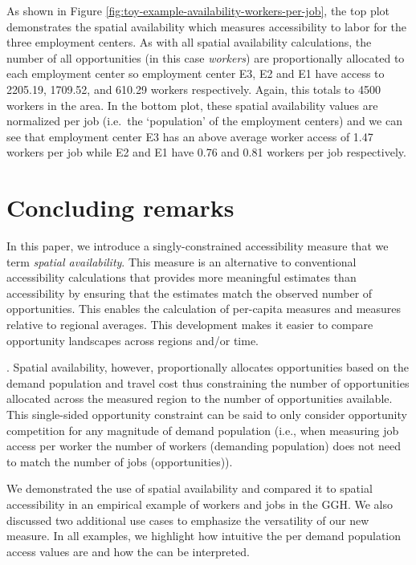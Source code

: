 \documentclass[]{elsarticle} %
\begin{document}
As shown in Figure \ref{fig:toy-example-availability-workers-per-job},
the top plot demonstrates the spatial availability which measures
accessibility to labor for the three employment centers. As with all
spatial availability calculations, the number of all opportunities (in
this case \emph{workers}) are proportionally allocated to each
employment center so employment center E3, E2 and E1 have access to
2205.19, 1709.52, and 610.29 workers respectively. Again, this totals to
4500 workers in the area. In the bottom plot, these spatial availability
values are normalized per job (i.e.~the `population' of the employment
centers) and we can see that employment center E3 has an above average
worker access of 1.47 workers per job while E2 and E1 have 0.76 and 0.81
workers per job respectively.

\hypertarget{concluding-remarks}{%
\section{Concluding remarks}\label{concluding-remarks}}

In this paper, we introduce a singly-constrained accessibility measure
that we term \emph{spatial availability}. This measure is an alternative
to conventional accessibility calculations that provides more meaningful
estimates than accessibility by ensuring that the estimates match the
observed number of opportunities. This enables the calculation of
per-capita measures and measures relative to regional averages. This
development makes it easier to compare opportunity landscapes across
regions and/or time.

. Spatial availability, however, proportionally allocates opportunities
based on the demand population and travel cost thus constraining the
number of opportunities allocated across the measured region to the
number of opportunities available. This single-sided opportunity
constraint can be said to only consider opportunity competition for any
magnitude of demand population (i.e., when measuring job access per
worker the number of workers (demanding population) does not need to
match the number of jobs (opportunities)).

We demonstrated the use of spatial availability and compared it to
spatial accessibility in an empirical example of workers and jobs in the
GGH. We also discussed two additional use cases to emphasize the
versatility of our new measure. In all examples, we highlight how
intuitive the per demand population access values are and how the can be
interpreted.
\end{document}
